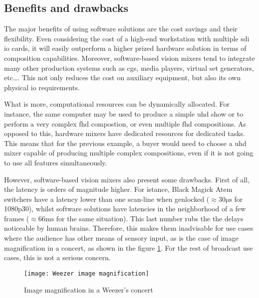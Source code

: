 \documentclass[../main.tex]{subfiles}
\begin{document}
\subsection{Benefits and drawbacks}
The major benefits of using software solutions are the cost savings and their flexibility. Even considering the cost of a high-end workstation with multiple \gls{sdi} \gls{io} cards, it will easily outperform a higher prized hardware solution in terms of composition capabilities. Moreover, software-based vision mixers tend to integrate many other production systems such as \glspl{cg}, media players, virtual set generators, etc\dots\cite{tricasterManual}\cite{vmixManual}. This not only reduces the cost on auxiliary equipment, but also its own physical \gls{io} requirements.\newline

What is more, computational resources can be dynamically allocated. For instance, the same computer may be used to produce a simple \gls{uhd} show or to perform a very complex \gls{fhd} compostion, or even multiple \gls{fhd} compositions. As opposed to this, hardware mixers have dedicated resources for dedicated tasks. This means that for the previous example, a buyer would need to choose a \gls{uhd} mixer capable of producing multiple complex compositions, even if it is not going to use all features simultaneously.\newline

However, software-based vision mixers also present some drawbacks. First of all, the latency is orders of magnitude higher. For istance, Black Magick Atem switchers have a latency lower than one scan-line when genlocked\cite{atemManual} ($\approx 30 \si{\micro\second}$ for 1080p30), whilst software solutions have latencies in the neighborhood of a few frames\cite{tricasterManual} ($\approx 66 \si{\milli\second}$ for the same situation). This last number rubs the the delays noticeable by human brains. Therefore, this makes them inadvisable for use cases where the audience has other means of sensory input, as is the case of image magnification in a concert, as shown in the figure \ref{fig:imag}. For the rest of broadcast use cases, this is not a serious concern.\newline

\begin{figure}[htbp]
    \centering
    \texttt{[image: Weezer image magnification]}
    \caption{Image magnification in a Weezer's concert}
    \label{fig:imag}
\end{figure}
\end{document}

